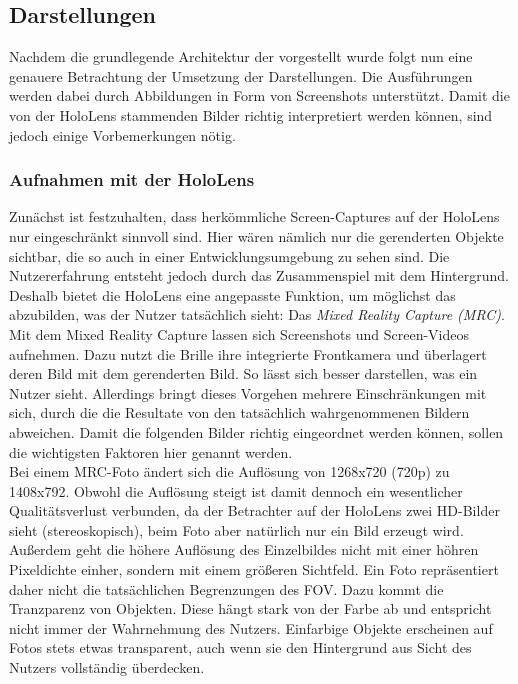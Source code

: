 \subsection{Darstellungen}
Nachdem die grundlegende Architektur der vorgestellt wurde folgt nun eine genauere Betrachtung der Umsetzung der Darstellungen. Die Ausführungen werden dabei durch Abbildungen in Form von Screenshots unterstützt. Damit die von der HoloLens stammenden Bilder richtig interpretiert werden können, sind jedoch einige Vorbemerkungen nötig.

\subsubsection{Aufnahmen mit der HoloLens}
Zunächst ist festzuhalten, dass herkömmliche Screen-Captures auf der HoloLens nur eingeschränkt sinnvoll sind. Hier wären nämlich nur die gerenderten Objekte sichtbar, die so auch in einer Entwicklungsumgebung zu sehen sind. Die Nutzererfahrung entsteht jedoch durch das Zusammenspiel mit dem Hintergrund. Deshalb bietet die HoloLens eine angepasste Funktion, um möglichst das abzubilden, was der Nutzer tatsächlich sieht: Das \textit{Mixed Reality Capture (MRC)}.\\

Mit dem Mixed Reality Capture lassen sich Screenshots und Screen-Videos aufnehmen. Dazu nutzt die Brille ihre integrierte Frontkamera und überlagert deren Bild mit dem gerenderten Bild. So lässt sich besser darstellen, was ein Nutzer sieht. Allerdings bringt dieses Vorgehen mehrere Einschränkungen mit sich, durch die die Resultate von den tatsächlich wahrgenommenen Bildern abweichen. Damit die folgenden Bilder richtig eingeordnet werden können, sollen die wichtigsten Faktoren hier genannt werden.\\

Bei einem MRC-Foto ändert sich die Auflösung von 1268x720 (720p) zu 1408x792. Obwohl die Auflösung steigt ist damit dennoch ein wesentlicher Qualitätsverlust verbunden, da der Betrachter auf der HoloLens zwei HD-Bilder sieht (stereoskopisch), beim Foto aber natürlich nur ein Bild erzeugt wird. Außerdem geht die höhere Auflösung des Einzelbildes nicht mit einer höhren Pixeldichte einher, sondern mit einem größeren Sichtfeld. Ein Foto repräsentiert daher nicht die tatsächlichen Begrenzungen des FOV. Dazu kommt die Tranzparenz von Objekten. Diese hängt stark von der Farbe ab und entspricht nicht immer der Wahrnehmung des Nutzers. Einfarbige Objekte erscheinen auf Fotos stets etwas transparent, auch wenn sie den Hintergrund aus Sicht des Nutzers vollständig überdecken.\\


